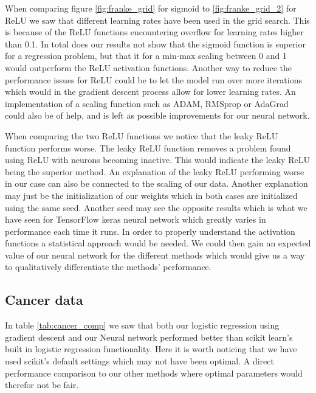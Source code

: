 \documentclass[11pt]{article}
\begin{document}
When comparing figure \ref{fig:franke_grid} for sigmoid to \ref{fig:franke_grid_2} for ReLU we saw that different learning rates have been used in the grid search. This is because of the ReLU functions encountering overflow for learning rates higher than 0.1. In total does our results not show that the sigmoid function is superior for a regression problem, but that it for a min-max scaling between 0 and 1 would outperform the ReLU activation functions. Another way to reduce the performance issues for ReLU could be to let the model run over more iterations which would in the gradient descent process allow for lower learning rates. An implementation of a scaling function such as ADAM, RMSprop or AdaGrad could also be of help, and is left as possible improvements for our neural network.

When comparing the two ReLU functions we notice that the leaky ReLU function performs worse. The leaky ReLU function removes a problem found using ReLU with neurons becoming inactive. This would indicate the leaky ReLU being the superior method. An explanation of the leaky ReLU performing worse in our case can also be connected to the scaling of our data. Another explanation may just be the initialization of our weights which in both cases are initialized using the same seed. Another seed may see the opposite results which is what we have seen for TensorFlow keras neural network which greatly varies in performance each time it runs. In order to properly understand the activation functions a statistical approach would be needed. We could then gain an expected value of our neural network for the different methods which would give us a way to qualitatively differentiate the methods' performance.

\subsection{Cancer data}
In table \ref{tab:cancer_comp} we saw that both our logistic regression using gradient descent and our Neural network performed better than scikit learn's built in logistic regression functionality. Here it is worth noticing that we have used scikit's default settings which may not have been optimal. A direct performance comparison to our other methods where optimal parameters would therefor not be fair.
\end{document}
